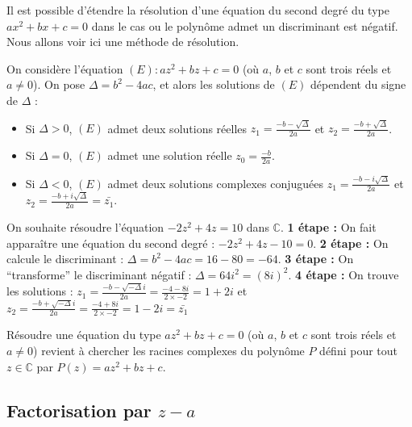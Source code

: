 	Il est possible d'étendre la résolution d'une équation du second degré du type $ax^2 + bx + c = 0$ dans le cas ou le polynôme admet un discriminant est négatif. Nous allons voir ici une méthode de résolution.
	
	\begin{formula}
		On considère l'équation $(E) : az^2 + bz + c = 0$ (où $a$, $b$ et $c$ sont trois réels et $a \neq 0$). On pose $\Delta = b^2 - 4ac$, et alors les solutions de $(E)$ dépendent du signe de $\Delta$ :
		\begin{itemize}
			\item Si $\Delta > 0$, $(E)$ admet deux solutions réelles $\displaystyle{z_1 = \frac{-b - \sqrt{\Delta}}{2a}}$ et $\displaystyle{z_2 = \frac{-b + \sqrt{\Delta}}{2a}}$.
			\item Si $\Delta = 0$, $(E)$ admet une solution réelle $\displaystyle{z_0 = \frac{-b}{2a}}$.
			\item Si $\Delta < 0$, $(E)$ admet deux solutions complexes conjuguées $\displaystyle{z_1 = \frac{-b - i\sqrt{\Delta}}{2a}}$ et $\displaystyle{z_2 = \frac{-b + i\sqrt{\Delta}}{2a} = \bar{z_1}}$.
		\end{itemize}
	\end{formula}
	
	\begin{tip}[Exemple]
		On souhaite résoudre l'équation $-2z^2 + 4z = 10$ dans $\mathbb{C}$.
		\newpar
		\textbf{1\iere{} étape :} On fait apparaître une équation du second degré : $-2z^2 + 4z - 10 = 0$.
		\newpar
		\textbf{2\ieme{} étape :} On calcule le discriminant : $\Delta = b^2 - 4ac = 16 - 80 = -64$.
		\newpar
		\textbf{3\ieme{} étape :} On ``transforme'' le discriminant négatif : $\Delta = 64i^2 = (8i)^2$.
		\newpar
		\textbf{4\ieme{} étape :} On trouve les solutions :
		\newpar
		$z_1 = \frac{-b - \sqrt{-\Delta}i}{2a} = \frac{-4 - 8i}{2 \times -2} = 1 + 2i$ et $z_2 = \frac{-b + \sqrt{-\Delta}i}{2a} = \frac{-4 + 8i}{2 \times -2} = 1 - 2i = \bar{z_1}$
	\end{tip}
	
	\begin{tip}
		Résoudre une équation du type $az^2 + bz + c = 0$ (où $a$, $b$ et $c$ sont trois réels et $a \neq 0$) revient à chercher les racines complexes du polynôme $P$ défini pour tout $z \in \mathbb{C}$ par $P(z) = az^2 + bz + c$.
	\end{tip}
	
	\subsection{Factorisation par \texorpdfstring{$z-a$}{z-a}}
	
